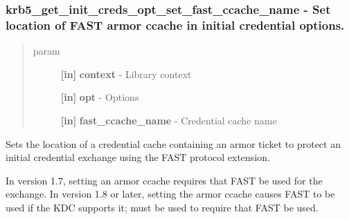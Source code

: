 \documentclass[letterpaper,10pt,english]{sphinxmanual}
\begin{document}
\subsubsection{krb5\_get\_init\_creds\_opt\_set\_fast\_ccache\_name -  Set location of FAST armor ccache in initial credential options.}
\label{appdev/refs/api/krb5_get_init_creds_opt_set_fast_ccache_name:krb5-get-init-creds-opt-set-fast-ccache-name-set-location-of-fast-armor-ccache-in-initial-credential-options}\label{appdev/refs/api/krb5_get_init_creds_opt_set_fast_ccache_name::doc}

\begin{fulllineitems}
\label{appdev/refs/api/krb5_get_init_creds_opt_set_fast_ccache_name:c.krb5_get_init_creds_opt_set_fast_ccache_name}
\end{fulllineitems}

\begin{quote}\begin{description}
\item[{param}] \leavevmode
\textbf{{[}in{]}} \textbf{context} - Library context

\textbf{{[}in{]}} \textbf{opt} - Options

\textbf{{[}in{]}} \textbf{fast\_ccache\_name} - Credential cache name

\end{description}\end{quote}

Sets the location of a credential cache containing an armor ticket to protect an initial credential exchange using the FAST protocol extension.

In version 1.7, setting an armor ccache requires that FAST be used for the exchange. In version 1.8 or later, setting the armor ccache causes FAST to be used if the KDC supports it; {\hyperref[appdev/refs/api/krb5_get_init_creds_opt_set_fast_flags:c.krb5_get_init_creds_opt_set_fast_flags]{}} must be used to require that FAST be used.
\end{document}
